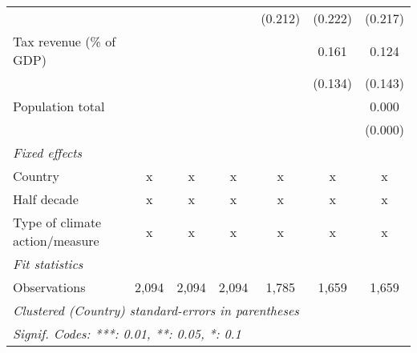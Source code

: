 \begin{tabular}{lcccccc}
                                                                      &         &         &         & (0.212)       & (0.222) & (0.217)\\   
   Tax revenue (\% of GDP)                                            &         &         &         &               & 0.161   & 0.124\\   
                                                                      &         &         &         &               & (0.134) & (0.143)\\   
   Population total                                                   &         &         &         &               &         & 0.000\\   
                                                                      &         &         &         &               &         & (0.000)\\   
   \emph{Fixed effects}\\
   Country                                                            & x       & x       & x       & x             & x       & x\\  
   Half decade                                                        & x       & x       & x       & x             & x       & x\\  
   Type of climate action/measure                                     & x       & x       & x       & x             & x       & x\\  
   \midrule \emph{Fit statistics}\\
   Observations                                                       & 2,094   & 2,094   & 2,094   & 1,785         & 1,659   & 1,659\\  
   \midrule
   \multicolumn{7}{l}{\emph{Clustered (Country) standard-errors in parentheses}}\\
   \multicolumn{7}{l}{\emph{Signif. Codes: ***: 0.01, **: 0.05, *: 0.1}}\\
\end{tabular}
\par\endgroup


